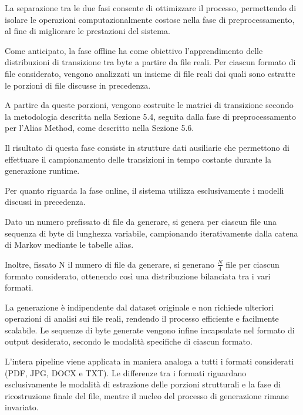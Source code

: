 \documentclass{report}
\begin{document}
\bigskip

La separazione tra le due fasi consente di ottimizzare il processo,
permettendo di isolare le operazioni computazionalmente costose nella fase di preprocessamento,
al fine di migliorare le prestazioni del sistema.

\bigskip

Come anticipato, la fase offline ha come obiettivo l'apprendimento delle distribuzioni di transizione tra byte
a partire da file reali. Per ciascun formato di file considerato,
vengono analizzati un insieme di file reali dai quali sono estratte le porzioni di file discusse in precedenza.

\bigskip

A partire da queste porzioni, vengono costruite le matrici di transizione
secondo la metodologia descritta nella Sezione 5.4, seguita dalla fase di preprocessamento
per l'Alias Method, come descritto nella Sezione 5.6.

Il risultato di questa fase consiste in strutture dati ausiliarie che
permettono di effettuare il campionamento delle transizioni in tempo costante
durante la generazione runtime.

\bigskip

Per quanto riguarda la fase online, il sistema utilizza esclusivamente i modelli discussi in precedenza.

Dato un numero prefissato di file da generare, si genera per ciascun file una sequenza di byte
di lunghezza variabile, campionando iterativamente dalla catena di Markov mediante le tabelle alias.

Inoltre, fissato N il numero di file da generare, si generano $\frac{N}{4}$  file per ciascun formato considerato,
ottenendo così una distribuzione bilanciata tra i vari formati.

\bigskip

La generazione è indipendente dal dataset originale e non richiede ulteriori
operazioni di analisi sui file reali, rendendo il processo efficiente e facilmente
scalabile. Le sequenze di byte generate vengono infine incapsulate nel formato
di output desiderato, secondo le modalità specifiche di ciascun formato.

\bigskip

L’intera pipeline viene applicata in maniera
analoga a tutti i formati considerati (PDF, JPG, DOCX e TXT). Le differenze tra i
formati riguardano esclusivamente le modalità di estrazione delle porzioni
strutturali e la fase di ricostruzione finale del file, mentre il nucleo del
processo di generazione rimane invariato.
\end{document}
